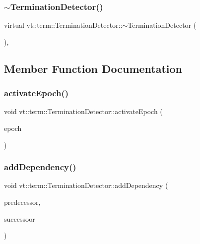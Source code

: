 \subsubsection{\texorpdfstring{$\sim$\+Termination\+Detector()}{~TerminationDetector()}}
{\footnotesize\ttfamily virtual vt\+::term\+::\+Termination\+Detector\+::$\sim$\+Termination\+Detector (\begin{DoxyParamCaption}{ }\end{DoxyParamCaption})\hspace{0.3cm}{\ttfamily [inline]}, {\ttfamily [virtual]}}



\subsection{Member Function Documentation}
\mbox{\label{structvt_1_1term_1_1_termination_detector_af9f932ff57f12da573a75adbbaee73df}} 
\subsubsection{\texorpdfstring{activate\+Epoch()}{activateEpoch()}}
{\footnotesize\ttfamily void vt\+::term\+::\+Termination\+Detector\+::activate\+Epoch (\begin{DoxyParamCaption}\item[{\hyperlink{namespacevt_a985a5adf291c34a3ca263b3378388236}{Epoch\+Type} const \&}]{epoch }\end{DoxyParamCaption})}

\mbox{\label{structvt_1_1term_1_1_termination_detector_a18685d6c5c81e5f1c73d92891cef601b}} 
\subsubsection{\texorpdfstring{add\+Dependency()}{addDependency()}}
{\footnotesize\ttfamily void vt\+::term\+::\+Termination\+Detector\+::add\+Dependency (\begin{DoxyParamCaption}\item[{\hyperlink{namespacevt_a985a5adf291c34a3ca263b3378388236}{Epoch\+Type}}]{predecessor,  }\item[{\hyperlink{namespacevt_a985a5adf291c34a3ca263b3378388236}{Epoch\+Type}}]{successoor }\end{DoxyParamCaption})}

